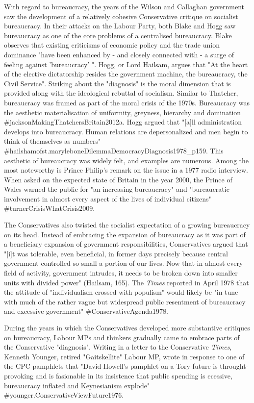 \documentclass[
]{article}
\begin{document}
With regard to bureaucracy, the years of the Wilson and Callaghan
government saw the development of a relatively cohesive Conservative
critique on socialist bureaucracy. In their attacks on the Labour Party,
both Blake and Hogg saw bureaucracy as one of the core problems of a
centralised bureaucracy. Blake observes that existing criticisms of
economic policy and the trade union dominance "have been enhanced by -
and closely connected with - a surge of feeling against 'bureaucracy' ".
Hogg, or Lord Hailsam, argues that "At the heart of the elective
dictatorship resides the government machine, the bureaucracy, the Civil
Service". Striking about the "diagnosis" is the moral dimension that is
provided along with the ideological rebuttal of socialism. Similar to
Thatcher, bureaucracy was framed as part of the moral crisis of the
1970s. Bureaucracy was the aesthetic materialisation of uniformity,
greyness, hierarchy and domination \#jacksonMakingThatchersBritain2012a.
Hogg argued that "{[}a{]}ll administration develops into bureaucracy.
Human relations are depersonalized and men begin to think of themselves
as numbers"
\#hailshamofst.maryleboneDilemmaDemocracyDiagnosis1978\_p159. This
aesthetic of bureaucracy was widely felt, and examples are numerous.
Among the most noteworthy is Prince Philip's remark on the issue in a
1977 radio interview. When asked on the expected state of Britain in the
year 2000, the Prince of Wales warned the public for "an increasing
bureaucracy" and "bureaucratic involvement in almost every aspect of the
lives of individual citizens" \#turnerCrisisWhatCrisis2009.

The Conservatives also twisted the socialist expectation of a growing
bureaucracy on its head. Instead of embracing the expansion of
bureaucracy as it was part of a beneficiary expansion of government
responsibilities, Conservatives argued that "{[}i{]}t was tolerable,
even beneficial, in former days precisely because central government
controlled so small a portion of our lives. Now that in almost every
field of activity, government intrudes, it needs to be broken down into
smaller units with divided power" (Hailsam, 165). The \emph{Times}
reported in April 1978 that the attitude of "individualism crossed with
populism" would likely be "in tune with much of the rather vague but
widespread public resentment of bureaucracy and excessive government"
\#ConservativeAgenda1978.

During the years in which the Conservatives developed more substantive
critiques on bureaucracy, Labour MPs and thinkers gradually came to
embrace parts of the Conservative "diagnosis". Writing in a letter to
the Conservative \emph{Times}, Kenneth Younger, retired "Gaitskellite"
Labour MP, wrote in response to one of the CPC pamphlets that "David
Howell's pamphlet on a Tory future is throught-provoking and is
fasionable in its insistence that public spending is ecessive,
bureaucracy inflated and Keynesianism explode"
\#younger.ConservativeViewFuture1976.
\end{document}
